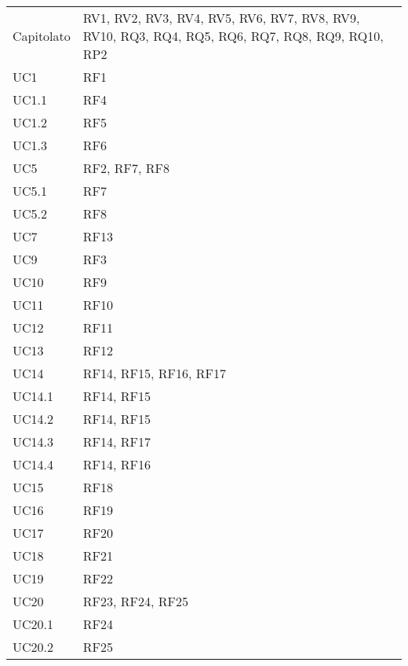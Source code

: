 {\begin{longtable}{C{.47\freewidth} C{.47\freewidth}}
      Capitolato & RV1, RV2, RV3, RV4, RV5, RV6, RV7, RV8, RV9, RV10,
                   RQ3, RQ4, RQ5, RQ6, RQ7, RQ8, RQ9, RQ10,
                   RP2\\
      UC1 & RF1\\
      UC1.1 & RF4\\
      UC1.2 & RF5\\
      UC1.3 & RF6\\
      UC5 & RF2, RF7, RF8\\
      UC5.1 & RF7\\
      UC5.2 & RF8\\
      UC7 & RF13\\
      UC9 & RF3\\
      UC10 & RF9\\
      UC11 & RF10\\
      UC12 & RF11\\
      UC13 & RF12\\
      UC14 & RF14, RF15, RF16, RF17\\
      UC14.1 & RF14, RF15\\
      UC14.2 & RF14, RF15\\
      UC14.3 & RF14, RF17\\
      UC14.4 & RF14, RF16\\
      UC15 & RF18\\
      UC16 & RF19\\
      UC17 & RF20\\
      UC18 & RF21\\
      UC19 & RF22\\
      UC20 & RF23, RF24, RF25\\
      UC20.1 & RF24\\
      UC20.2 & RF25\\		
      \bottomrule
      \end{longtable}
}
\newpage
